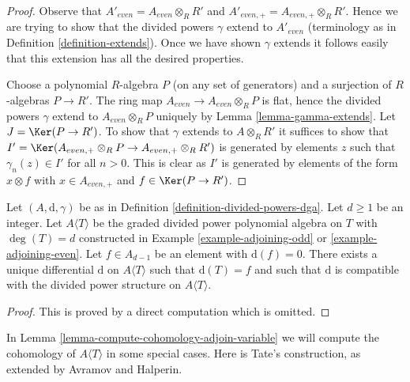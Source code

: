 \begin{proof}
Observe that $A'_{even} = A_{even} \otimes_R R'$ and
$A'_{even, +} = A_{even, +} \otimes_R R'$. Hence we are trying to
show that the divided powers $\gamma$ extend to $A'_{even}$
(terminology as in Definition \ref{definition-extends}).
Once we have shown $\gamma$ extends it follows easily that this
extension has all the desired properties.

\medskip\noindent
Choose a polynomial $R$-algebra $P$ (on any set of generators)
and a surjection of $R$-algebras
$P \to R'$. The ring map $A_{even} \to A_{even} \otimes_R P$ is flat,
hence the divided powers $\gamma$ extend to $A_{even} \otimes_R P$
uniquely by Lemma \ref{lemma-gamma-extends}.
Let $J = \Ker(P \to R')$. To show that $\gamma$ extends
to $A \otimes_R R'$ it suffices to show that
$I' = \Ker(A_{even, +} \otimes_R P \to A_{even, +} \otimes_R R')$
is generated by elements $z$ such that $\gamma_n(z) \in I'$
for all $n > 0$. This is clear as $I'$ is generated by elements
of the form $x \otimes f$ with
$x \in A_{even, +}$ and $f \in \Ker(P \to R')$.
\end{proof}

\begin{lemma}
\label{lemma-extend-differential}
Let $(A, \text{d}, \gamma)$ be as in
Definition \ref{definition-divided-powers-dga}.
Let $d \geq 1$ be an integer.
Let $A\langle T \rangle$ be the graded divided power polynomial algebra
on $T$ with $\deg(T) = d$
constructed in Example \ref{example-adjoining-odd} or
\ref{example-adjoining-even}.
Let $f \in A_{d - 1}$ be an element with $\text{d}(f) = 0$.
There exists a unique differential $\text{d}$
on $A\langle T\rangle$ such that $\text{d}(T) = f$ and
such that $\text{d}$ is compatible with the divided power
structure on $A\langle T \rangle$.
\end{lemma}

\begin{proof}
This is proved by a direct computation which is omitted.
\end{proof}

\noindent
In Lemma \ref{lemma-compute-cohomology-adjoin-variable}
we will compute the cohomology of $A\langle T \rangle$ in some special cases.
Here is Tate's construction, as extended
by Avramov and Halperin.

